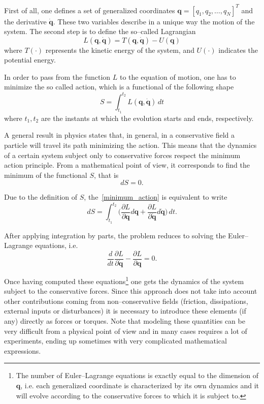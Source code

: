 \documentclass[11pt]{article}
\begin{document}
First of all, one defines a set of generalized coordinates $\bm{q} = [q_1, q_2, \dots, q_N]^T$ and the derivative $\dot{\bm{q}}$. These two variables describe in a unique way the motion of the system. The second step is to define the so--called Lagrangian
\begin{equation}
L(\bm{q},\dot{\bm{q}}) = T(\bm{q},\dot{\bm{q}}) - U(\bm{q})
\label{lagrangian}
\end{equation}
where $T(\cdot)$ represents the kinetic energy of the system, and $U(\cdot)$ indicates the potential energy.

In order to pass from the function $L$ to the equation of motion, one has to minimize the so called action, which is a functional of the following shape
\begin{equation}
S = \int_{t_1}^{t_2} L(\bm{q},\dot{\bm{q}}) \, dt
\label{action_functional}
\end{equation}
where $t_1, t_2$ are the instants at which the evolution starts and ends, respectively.

A general result in physics states that, in general, in a conservative field a particle will travel its path minimizing the action. This means that the dynamics of a certain system subject only to conservative forces respect the minimum action principle. From a mathematical point of view, it corresponds to find the minimum of the functional $S$, that is
\begin{equation}
dS = 0.
\label{minimum_action}
\end{equation}

Due to the definition of $S$, the~\eqref{minimum_action} is equivalent to write
\[
dS = \int_{t_1}^{t_2} \Biggl( \dfrac{\partial L}{\partial \bm{q}}d\bm{q} + \dfrac{\partial L}{\partial \dot{\bm{q}}}d\dot{\bm{q}}\Biggr) \, dt.
\]

After applying integration by parts, the problem reduces to solving the Euler--Lagrange equations, i.e.
\begin{equation}
\dfrac{d}{dt} \dfrac{\partial L}{\partial \dot{\bm{q}}} - \dfrac{\partial L}{\partial \bm{q}} = 0.
\label{euler_lagrange}
\end{equation}

Once having computed these equations\footnote{The number of Euler--Lagrange equations is exactly equal to the dimension of $\bm{q}$, i.e. each generalized coordinate is characterized by its own dynamics and it will evolve according to the conservative forces to which it is subject to.} one gets the dynamics of the system subject to the conservative forces. Since this approach does not take into account other contributions coming from non--conservative fields (friction, dissipations, external inputs or disturbances) it is necessary to introduce these elements (if any) directly as forces or torques. Note that modeling these quantities can be very difficult from a physical point of view and in many cases requires a lot of experiments, ending up sometimes with very complicated mathematical expressions.
\end{document}
